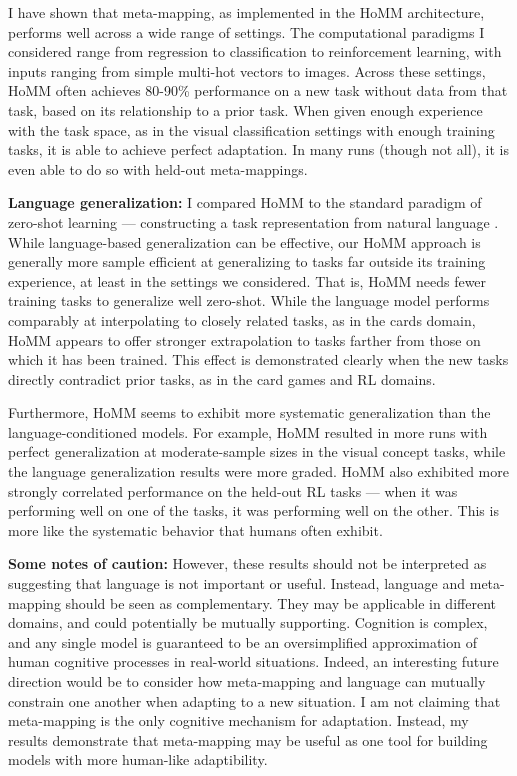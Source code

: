 I have shown that meta-mapping, as implemented in the HoMM architecture, performs well across a wide range of settings. The computational paradigms I considered range from regression to classification to reinforcement learning, with inputs ranging from simple multi-hot vectors to images. Across these settings, HoMM often achieves 80-90\% performance on a new task without data from that task, based on its relationship to a prior task. When given enough experience with the task space, as in the visual classification settings with enough training tasks, it is able to achieve perfect adaptation. In many runs (though not all), it is even able to do so with held-out meta-mappings. \par

\textbf{Language generalization:} I compared HoMM to the standard paradigm of zero-shot learning --- constructing a task representation from natural language \citep[e.g.][also see below]{Larochelle2008}. While language-based generalization can be effective, our HoMM approach is generally more sample efficient at generalizing to tasks far outside its training experience, at least in the settings we considered. That is, HoMM needs fewer training tasks to generalize well zero-shot. While the language model performs comparably at interpolating to closely related tasks, as in the cards domain, HoMM appears to offer stronger extrapolation to tasks farther from those on which it has been trained. This effect is demonstrated clearly when the new tasks directly contradict prior tasks, as in the card games and RL domains.\par

Furthermore, HoMM seems to exhibit more systematic generalization than the language-conditioned models. For example, HoMM resulted in more runs with perfect generalization at moderate-sample sizes in the visual concept tasks, while the language generalization results were more graded. HoMM also exhibited more strongly correlated performance on the held-out RL tasks --- when it was performing well on one of the tasks, it was performing well on the other. This is more like the systematic behavior that humans often exhibit. \par

\textbf{Some notes of caution:} However, these results should not be interpreted as suggesting that language is not important or useful. Instead, language and meta-mapping should be seen as complementary. They may be applicable in different domains, and could potentially be mutually supporting. Cognition is complex, and any single model is guaranteed to be an oversimplified approximation of human cognitive processes in real-world situations. Indeed, an interesting future direction would be to consider how meta-mapping and language can mutually constrain one another when adapting to a new situation. I am not claiming that meta-mapping is the only cognitive mechanism for adaptation. Instead, my results demonstrate that meta-mapping may be useful as one tool for building models with more human-like adaptibility.  \par

